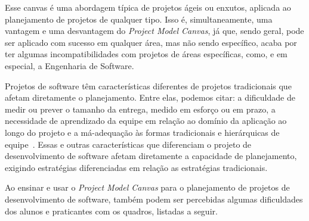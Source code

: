 \documentclass[fontsize=12pt, a4paper,pagesize=auto,toc=listof, ,twoside,chapterprefix=false,appendixprefix=true,open=right]{scrbook}
\begin{document}
Esse canvas é uma abordagem típica de projetos ágeis ou enxutos, aplicada ao planejamento de projetos de qualquer tipo. Isso é, simultaneamente, uma vantagem e uma desvantagem do \textit{Project Model Canvas}, já que, sendo geral, pode ser aplicado com sucesso em qualquer área, mas não sendo específico, acaba por ter algumas incompatibilidades com projetos de áreas específicas, como, e em especial, a Engenharia de Software.

Projetos de software têm características diferentes de projetos tradicionais que afetam diretamente o planejamento. Entre elas, podemos citar: a dificuldade de medir ou prever o tamanho da entrega, medido em esforço ou em prazo\citeauthor{mike:agile:estimating,cocomo2:manual,pressman:2019}, a necessidade de aprendizado da equipe em relação ao domínio da aplicação ao longo do projeto e a má-adequação às formas tradicionais e hierárquicas de equipe~\citep{Constantine1993}. Essas e outras características que diferenciam o projeto de desenvolvimento de software afetam diretamente a capacidade de planejamento, exigindo estratégias diferenciadas em relação as estratégias tradicionais.

Ao ensinar e usar o \textit{Project Model Canvas} para o planejamento de projetos de desenvolvimento de software, também podem ser percebidas algumas dificuldades dos alunos e praticantes com os quadros, listadas a seguir.
\end{document}
